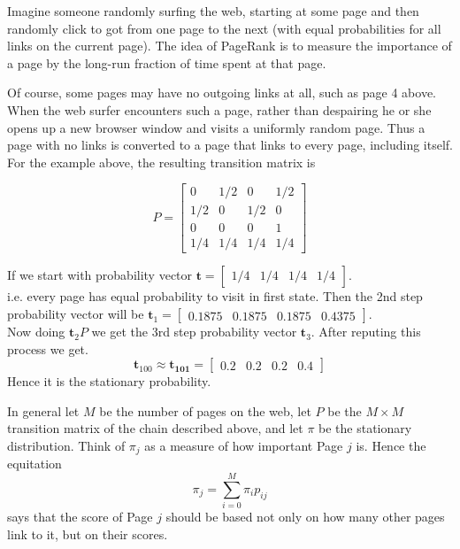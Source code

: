 Imagine someone randomly surfing the web, starting at some page and 
then randomly click to got from one page to the next (with equal probabilities for
all links on the current page).
 The idea of PageRank is to measure the importance
of a page by the long-run fraction of time spent at that page.

Of course, some pages may have no outgoing links at all, such as page 4 above. When
the web surfer encounters such a page, rather than despairing he or she opens up a
new browser window and visits a uniformly random page. Thus a page with no links
is converted to a page that links to every page, including itself. For the example
above, the resulting transition matrix is

\[
    P =
    \begin{bmatrix}
        0 & 1/2 & 0 & 1/2 \\ 
        1/2 & 0 & 1/2 & 0 \\ 
        0 & 0 & 0 & 1 \\
        1/4 & 1/4 & 1/4 & 1/4
    \end{bmatrix} 
\]

If we start with probability vector 
$ \mathbf{t} = \begin{bmatrix}
    1/4 & 1/4 & 1/4 & 1/4 
\end{bmatrix}  $.\\ 
i.e. every page has equal probability to visit in first state. Then the 2nd step 
probability vector will be 
$\mathbf{t}_{1}= 
    \begin{bmatrix}
        0.1875 & 0.1875 & 0.1875 & 0.4375 
    \end{bmatrix} 
$.\\ 
Now doing $ \mathbf{t}_{2}P $ we get the 3rd step probability vector $ \mathbf{t}_{3} $.
After reputing this process we get.
\[
    \mathbf{t}_{100} \approx \mathbf{t_{101}} = \begin{bmatrix}
        0.2 & 0.2 & 0.2 & 0.4 
    \end{bmatrix} 
\]
Hence it is the stationary probability.

In general let $ M $ be the number of pages on the web, let  $ P $ be the  $ M\times M $
transition matrix of the chain described above, and 
let $ \pi $ be the stationary distribution.
Think of $ \pi_{j} $ as a measure of how important Page $j$ is. 
Hence the equitation 
\[
    \pi_{j}=\sum_{i=0}^{M} \pi_{i}p_{ij}
\]
says that the score of Page $j$ should be based not only on how many other pages link
to it, but on their scores.

